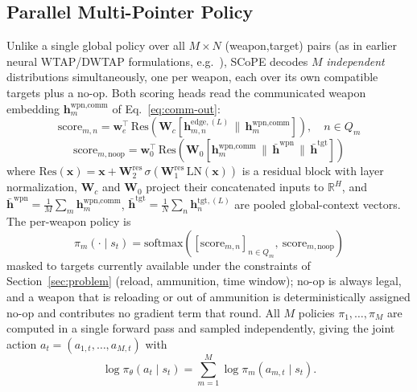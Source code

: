 \subsection{Parallel Multi-Pointer Policy}
\label{sec:parallel-decoder}

Unlike a single global policy over all $M \times N$ (weapon,target) pairs (as in earlier neural WTAP/DWTAP formulations, e.g.~\cite{na2023weapon}), SCoPE decodes $M$ \emph{independent} distributions simultaneously, one per weapon, each over its own compatible targets plus a no-op. Both scoring heads read the communicated weapon embedding $\bm{h}_m^{\text{wpn,comm}}$ of Eq.~\eqref{eq:comm-out}:
\begin{equation}
\label{eq:edge-score}
\text{score}_{m,n} = \bm{w}_e^\top \, \text{Res}\!\left(\bm{W}_c\!\left[\bm{h}_{m,n}^{\text{edge},(L)} \,\|\, \bm{h}_m^{\text{wpn,comm}}\right]\right), \quad n \in Q_m
\end{equation}
\begin{equation}
\label{eq:noop-score}
\text{score}_{m,\text{noop}} = \bm{w}_0^\top \, \text{Res}\!\left(\bm{W}_0\left[\bm{h}_m^{\text{wpn,comm}} \,\|\, \bar{\bm{h}}^{\text{wpn}} \,\|\, \bar{\bm{h}}^{\text{tgt}}\right]\right)
\end{equation}
where $\text{Res}(\bm{x}) = \bm{x} + \bm{W}_2^{\text{res}}\,\sigma(\bm{W}_1^{\text{res}}\,\text{LN}(\bm{x}))$ is a residual block with layer normalization, $\bm{W}_c$ and $\bm{W}_0$ project their concatenated inputs to $\mathbb{R}^H$, and $\bar{\bm{h}}^{\text{wpn}} = \frac{1}{M}\sum_m \bm{h}_m^{\text{wpn,comm}}$, $\bar{\bm{h}}^{\text{tgt}} = \frac{1}{N}\sum_n \bm{h}_n^{\text{tgt},(L)}$ are pooled global-context vectors. The per-weapon policy is
\begin{equation}
\label{eq:parallel-policy}
\pi_m(\cdot \mid s_t) = \text{softmax}\!\left(\left[\text{score}_{m,n}\right]_{n \in Q_m},\ \text{score}_{m,\text{noop}}\right)
\end{equation}
masked to targets currently available under the constraints of Section~\ref{sec:problem} (reload, ammunition, time window); no-op is always legal, and a weapon that is reloading or out of ammunition is deterministically assigned no-op and contributes no gradient term that round. All $M$ policies $\pi_1, \ldots, \pi_M$ are computed in a single forward pass and sampled independently, giving the joint action $a_t = (a_{1,t}, \ldots, a_{M,t})$ with
\begin{equation}
\log \pi_\theta(a_t \mid s_t) = \sum_{m=1}^{M} \log \pi_m(a_{m,t} \mid s_t).
\end{equation}
